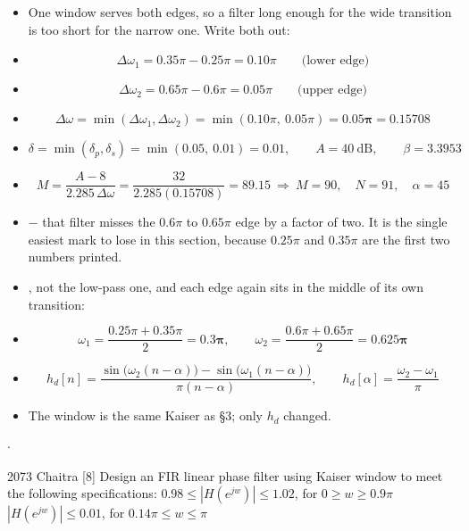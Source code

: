 \begin{itemize}
  \item {} One window serves both edges, so a filter long enough for
        the wide transition is too short for the narrow one. Write both out:
  \item[] \[ \Delta\omega_1=0.35\pi-0.25\pi=0.10\pi
             \qquad\text{(lower edge)} \]
  \item[] \[ \Delta\omega_2=0.65\pi-0.6\pi=0.05\pi
             \qquad\text{(upper edge)} \]
  \item[] \[ \Delta\omega=\min(\Delta\omega_1,\Delta\omega_2)
             =\min(0.10\pi,\ 0.05\pi)=\mathbf{0.05\pi}=0.15708 \]
  \item[] \[ \delta=\min(\delta_p,\delta_s)=\min(0.05,\ 0.01)=0.01,\qquad
             A=40\ \text{dB},\qquad \beta=3.3953 \]
  \item[] \[ M=\frac{A-8}{2.285\,\Delta\omega}=\frac{32}{2.285(0.15708)}=89.15
             \ \Rightarrow\ M=90,\quad \boxed{N=91},\quad \alpha=45 \]
  \item {} $-$ that filter misses the $0.6\pi$ to $0.65\pi$ edge by a factor of two.
        It is the single easiest mark to lose in this section, because $0.25\pi$ and
        $0.35\pi$ are the first two numbers printed.
  \item {}, not the
        low-pass one, and each edge again sits in the middle of its own transition:
  \item[] \[ \omega_1=\frac{0.25\pi+0.35\pi}{2}=\mathbf{0.3\pi},\qquad
             \omega_2=\frac{0.6\pi+0.65\pi}{2}=\mathbf{0.625\pi} \]
  \item[] \[ h_d[n]=\frac{\sin\big(\omega_2(n-\alpha)\big)-\sin\big(\omega_1(n-\alpha)\big)}
                        {\pi(n-\alpha)},\qquad
             h_d[\alpha]=\frac{\omega_2-\omega_1}{\pi} \]
  \item The window is the same Kaiser as \S3; only $h_d$ changed.
\end{itemize}

{\color{sub}\footnotesize {} \gap$\cdot$\gap {}}

\begin{asked}{2073 Chaitra \textperiodcentered{} [8]}
Design an FIR linear phase filter using Kaiser window to meet the following
specifications:\newline
$0.98\le|H(e^{jw})|\le1.02$, \quad for $0\ge w\ge0.9\pi$\newline
$|H(e^{jw})|\le0.01$, \quad for $0.14\pi\le w\le\pi$
\end{asked}

